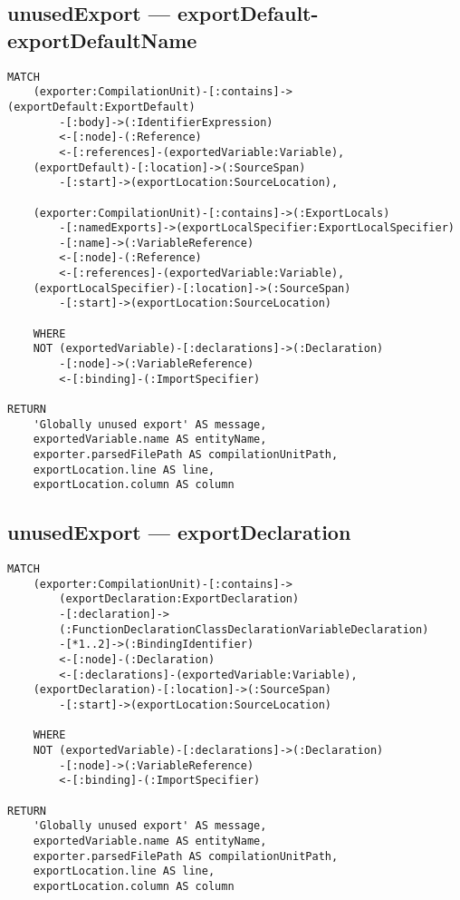 \subsection{unusedExport — exportDefault-exportDefaultName}
\begin{lstlisting}[language=Cypher]
MATCH
    (exporter:CompilationUnit)-[:contains]->(exportDefault:ExportDefault)
        -[:body]->(:IdentifierExpression)
        <-[:node]-(:Reference)
        <-[:references]-(exportedVariable:Variable),
    (exportDefault)-[:location]->(:SourceSpan)
        -[:start]->(exportLocation:SourceLocation),

    (exporter:CompilationUnit)-[:contains]->(:ExportLocals)
        -[:namedExports]->(exportLocalSpecifier:ExportLocalSpecifier)
        -[:name]->(:VariableReference)
        <-[:node]-(:Reference)
        <-[:references]-(exportedVariable:Variable),
    (exportLocalSpecifier)-[:location]->(:SourceSpan)
        -[:start]->(exportLocation:SourceLocation)

    WHERE
    NOT (exportedVariable)-[:declarations]->(:Declaration)
        -[:node]->(:VariableReference)
        <-[:binding]-(:ImportSpecifier)

RETURN
    'Globally unused export' AS message,
    exportedVariable.name AS entityName,
    exporter.parsedFilePath AS compilationUnitPath,
    exportLocation.line AS line,
    exportLocation.column AS column
\end{lstlisting}


\newpage
\subsection{unusedExport — exportDeclaration}
\begin{lstlisting}[language=Cypher]
MATCH
    (exporter:CompilationUnit)-[:contains]->
        (exportDeclaration:ExportDeclaration)
        -[:declaration]->
        (:FunctionDeclarationClassDeclarationVariableDeclaration)
        -[*1..2]->(:BindingIdentifier)
        <-[:node]-(:Declaration)
        <-[:declarations]-(exportedVariable:Variable),
    (exportDeclaration)-[:location]->(:SourceSpan)
        -[:start]->(exportLocation:SourceLocation)

    WHERE
    NOT (exportedVariable)-[:declarations]->(:Declaration)
        -[:node]->(:VariableReference)
        <-[:binding]-(:ImportSpecifier)

RETURN
    'Globally unused export' AS message,
    exportedVariable.name AS entityName,
    exporter.parsedFilePath AS compilationUnitPath,
    exportLocation.line AS line,
    exportLocation.column AS column
\end{lstlisting}


